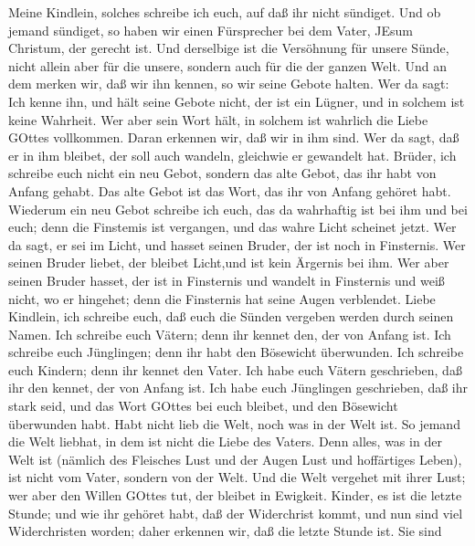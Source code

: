  Meine Kindlein, solches schreibe ich euch, auf daß ihr
nicht sündiget. Und ob jemand sündiget, so haben wir einen Fürsprecher
bei dem Vater, JEsum Christum, der gerecht ist.  Und
derselbige ist die Versöhnung für unsere Sünde, nicht allein aber für
die unsere, sondern auch für die der ganzen Welt.  Und an
dem merken wir, daß wir ihn kennen, so wir seine Gebote halten.
 Wer da sagt: Ich kenne ihn, und hält seine Gebote nicht,
der ist ein Lügner, und in solchem ist keine Wahrheit.  Wer
aber sein Wort hält, in solchem ist wahrlich die Liebe GOttes
vollkommen. Daran erkennen wir, daß wir in ihm sind.  Wer da
sagt, daß er in ihm bleibet, der soll auch wandeln, gleichwie er
gewandelt hat.  Brüder, ich schreibe euch nicht ein neu
Gebot, sondern das alte Gebot, das ihr habt von Anfang gehabt. Das alte
Gebot ist das Wort, das ihr von Anfang gehöret habt. 
Wiederum ein neu Gebot schreibe ich euch, das da wahrhaftig ist bei ihm
und bei euch; denn die Finstemis ist vergangen, und das wahre Licht
scheinet jetzt.  Wer da sagt, er sei im Licht, und hasset
seinen Bruder, der ist noch in Finsternis.  Wer seinen
Bruder liebet, der bleibet Licht,und ist kein Ärgernis bei ihm.
 Wer aber seinen Bruder hasset, der ist in Finsternis und
wandelt in Finsternis und weiß nicht, wo er hingehet; denn die
Finsternis hat seine Augen verblendet.  Liebe Kindlein, ich
schreibe euch, daß euch die Sünden vergeben werden durch seinen Namen.
 Ich schreibe euch Vätern; denn ihr kennet den, der von
Anfang ist. Ich schreibe euch Jünglingen; denn ihr habt den Bösewicht
überwunden. Ich schreibe euch Kindern; denn ihr kennet den Vater.
 Ich habe euch Vätern geschrieben, daß ihr den kennet, der
von Anfang ist. Ich habe euch Jünglingen geschrieben, daß ihr stark
seid, und das Wort GOttes bei euch bleibet, und den Bösewicht überwunden
habt.  Habt nicht lieb die Welt, noch was in der Welt ist.
So jemand die Welt liebhat, in dem ist nicht die Liebe des Vaters.
 Denn alles, was in der Welt ist (nämlich des Fleisches
Lust und der Augen Lust und hoffärtiges Leben), ist nicht vom Vater,
sondern von der Welt.  Und die Welt vergehet mit ihrer
Lust; wer aber den Willen GOttes tut, der bleibet in Ewigkeit.
 Kinder, es ist die letzte Stunde; und wie ihr gehöret
habt, daß der Widerchrist kommt, und nun sind viel Widerchristen worden;
daher erkennen wir, daß die letzte Stunde ist.  Sie sind
